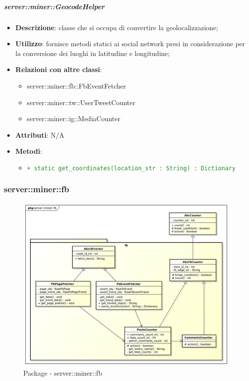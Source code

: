 		\subparagraph{server::miner::GeocodeHelper} %
		\label{subp:server_miner_GeocodeHelper}
				\begin{itemize}
				\item \textbf{Descrizione}: classe che si occupa di convertire la geolocalizzazione;
				\item \textbf{Utilizzo}: fornisce metodi statici ai social network presi in considerazione per la conversione dei luoghi in latitudine e longitudine;
				\item \textbf{Relazioni con altre classi}:
					\begin{itemize}
						\item server::miner::fb::FbEventFetcher
						\item server::miner::tw::UserTweetCounter
						\item server::miner::ig::MediaCounter
					\end{itemize}
				\item \textbf{Attributi}: N/A
				\item \textbf{Metodi}:
					\begin{itemize}
						\item \textcolor{forestgreen}{\texttt{+ static get\_coordinates(location\_str : String) : Dictionary}}
					\end{itemize}
			\end{itemize}

\subsubsection{server::miner::fb} %
\label{ssub:bdsm_app_server_miner_fb}
\begin{figure}[htbp]
	\centering
	\centerline{\includegraphics[scale=0.3]{./images/server/miner_fb.pdf}}
	\caption{Package - server::miner::fb}
\end{figure}

